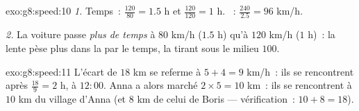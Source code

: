 \begin{solution}{exo:g8:speed:10}
\emph{1.} Temps~: $\frac{120}{80} = 1.5$ h et $\frac{120}{120} = 1$
h. ~: $\frac{240}{2.5} = 96$ km/h.

\emph{2.} La voiture passe \emph{plus de temps} à $80$ km/h ($1.5$ h)
qu'à $120$ km/h ($1$ h)~: la  lente pèse plus dans la  par le temps, la tirant sous le milieu $100$.
\end{solution}

\begin{solution}{exo:g8:speed:11}
L'écart de $18$ km se referme à $5 + 4 = 9$ km/h~: ils se rencontrent
après $\frac{18}{9} = 2$ h, à $12{:}00$. Anna a alors marché
$2 \times 5 = 10$ km~: ils se rencontrent à $10$ km du village
d'Anna (et $8$ km de celui de Boris --- vérification~: $10 + 8 =
18$).
\end{solution}


